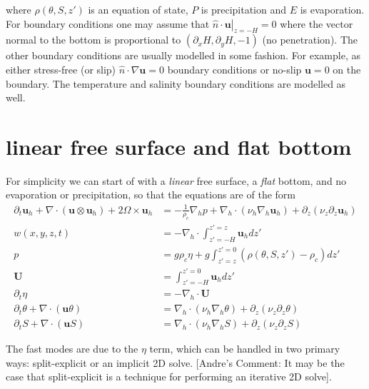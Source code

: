 \documentclass{article}
\begin{document}
where $\rho(\theta, S, z')$ is an equation of state, $P$ is precipitation and $E$ is evaporation. For boundary conditions one may assume that $\left. \hat{n} \cdot \bm{u} \right|_{z = -H} = 0$ where the vector normal to the bottom is proportional to $(\partial_x H, \partial_y H, -1)$ (no penetration). The other boundary conditions are usually modelled in some fashion. For example, as either stress-free (or slip) $\hat{n} \cdot \nabla \bm{u} = 0$ boundary conditions or no-slip $\bm{u} = 0$ on the boundary. The temperature and salinity boundary conditions are modelled as well. 

\section{linear free surface and flat bottom}
For simplicity we can start of with a \textit{linear} free surface, a \textit{flat} bottom, and no evaporation or precipitation, so that the equations are of the form
\begin{align}
    \partial_t \bm{u}_h + \nabla \cdot \left( \bm{u} \otimes \bm{u}_h  \right) + 2 \Omega \times \bm{u}_h &= - \frac{1}{\rho_c} \nabla_h p + \nabla_h \cdot \left( \nu_h  \nabla_h \bm{u}_h \right) + \partial_z \left( \nu_z \partial_z \bm{u}_h \right)
    \\
          w(x,y,z,t) &= -   \nabla_h \cdot \int_{z' = -H}^{z' = z} \bm{u}_h dz'  
          \\
      p &= g \rho_c \eta + g\int^{z' = 0}_{z' = z} \left( \rho(\theta, S, z') - \rho_c \right) dz' 
      \\
    \bm{U} &= \int_{z' = -H}^{z' = 0} \bm{u}_h dz'
    \\
    \partial_t \eta  &= - \nabla_h \cdot \bm{U} 
    \\
    \partial_t \theta + \nabla \cdot \left( \bm{u} \theta  \right) &= \nabla_h \cdot \left( \nu_h  \nabla_h \theta \right) + \partial_z \left( \nu_z \partial_z \theta \right)
        \\
      \partial_t S + \nabla \cdot \left( \bm{u} S  \right) &= \nabla_h \cdot \left( \nu_h  \nabla_h S\right) + \partial_z \left( \nu_z \partial_z S \right)
\end{align}

The fast modes are due to the $\eta$ term, which can be handled in two primary ways: split-explicit or an implicit 2D solve. [Andre's Comment: It may be the case that split-explicit is a technique for performing an iterative 2D solve].
\end{document}
